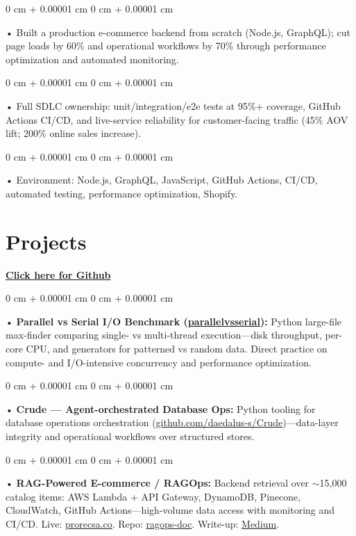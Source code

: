 \documentclass[10pt, letterpaper]{article}
\newenvironment{onecolentry}{
    \begin{adjustwidth}{
        0 cm + 0.00001 cm
    }{
        0 cm + 0.00001 cm
    }
}{
    \end{adjustwidth}
} %
\begin{document}
        \begin{onecolentry}
             • Built a production e-commerce backend from scratch (Node.js, GraphQL); cut page loads by 60\% and operational workflows by 70\% through performance optimization and automated monitoring.
        \end{onecolentry}
        \begin{onecolentry}
             • Full SDLC ownership: unit/integration/e2e tests at 95\%+ coverage, GitHub Actions CI/CD, and live-service reliability for customer-facing traffic (45\% AOV lift; 200\% online sales increase).
        \end{onecolentry}
        \begin{onecolentry}
             • Environment: Node.js, GraphQL, JavaScript, GitHub Actions, CI/CD, automated testing, performance optimization, Shopify.
        \end{onecolentry}

        \vspace{0.4cm}
\section{Projects}
    \vspace{2 pt}
\textbf{\href{https://github.com/daedalus-s}{Click here for Github}}
\begin{onecolentry}
     • \textbf{Parallel vs Serial I/O Benchmark (\href{https://github.com/daedalus-s/parallelvsserial}{parallelvsserial}):} Python large-file max-finder comparing single- vs multi-thread execution---disk throughput, per-core CPU, and generators for patterned vs random data. Direct practice on compute- and I/O-intensive concurrency and performance optimization.
\end{onecolentry}
\begin{onecolentry}
     • \textbf{Crude --- Agent-orchestrated Database Ops:} Python tooling for database operations orchestration (\href{https://github.com/daedalus-s/Crude}{github.com/daedalus-s/Crude})---data-layer integrity and operational workflows over structured stores.
\end{onecolentry}
\begin{onecolentry}
     • \textbf{RAG-Powered E-commerce / RAGOps:} Backend retrieval over $\sim$15,000 catalog items: AWS Lambda + API Gateway, DynamoDB, Pinecone, CloudWatch, GitHub Actions---high-volume data access with monitoring and CI/CD. Live: \href{https://prorecsa.co}{prorecsa.co}. Repo: \href{https://github.com/daedalus-s/ragops-doc}{ragops-doc}. Write-up: \href{https://medium.com/@sreenikethaathreya/from-rags-to-riches-bba8a671d5e6}{Medium}.
\end{onecolentry}
\vspace{2 pt}
        \vspace{2 pt }
\end{document}
